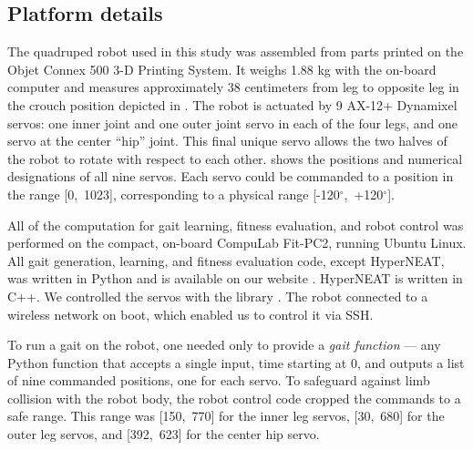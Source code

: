\subsection{Platform details}






The quadruped robot used in this study was assembled from parts
printed on the Objet Connex 500 3-D Printing System. It weighs 1.88
kg with the on-board computer and measures approximately 38
centimeters from leg to opposite leg in the crouch position depicted
in . The robot is actuated by 9 AX-12+
Dynamixel servos: one inner joint and one outer joint servo in each of
the four legs, and one servo at the center ``hip'' joint.  This final
unique servo allows the two halves of the robot to rotate with respect
to each other.  shows the positions and numerical
designations of all nine servos.  Each servo could be commanded to a
position in the range [0,~1023], corresponding to a physical range
[-120$^{\circ}$,~+120$^{\circ}$].

All of the computation for gait learning, fitness evaluation, and
robot control was performed on the compact, on-board CompuLab Fit-PC2,
running Ubuntu Linux.  All gait generation, learning, and fitness
evaluation code, except HyperNEAT, was written in Python and is
available on our website \cite{quadratotWeb}.  HyperNEAT is written in
C++.  We controlled the servos with the  library
\cite{pydynamixel}.  The robot connected to a wireless network on
boot, which enabled us to control it via SSH.


To run a gait on the robot, one needed only to provide a \emph{gait
  function} --- any Python function that accepts a single input, time
starting at 0, and outputs a list of nine commanded positions, one for
each servo.  To safeguard against limb collision with the robot body,
the robot control code cropped the commands to a safe range.  This
range was [150,~770] for the inner leg servos, [30,~680] for the outer
leg servos, and [392,~623] for the center hip servo.





